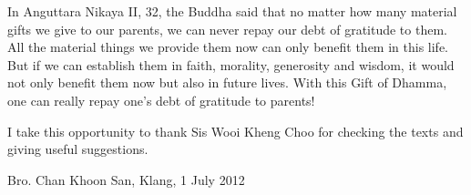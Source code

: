 In Anguttara Nikaya II, 32, the Buddha said that no matter how many material gifts we give to our parents, we can never repay our debt of gratitude to them. All the material things we provide them now can only benefit them in this life. But if we can establish them in faith, morality, generosity and wisdom, it would not only benefit them now but also in future lives. With this Gift of Dhamma, one can really repay one’s debt of gratitude to parents!

I take this opportunity to thank Sis Wooi Kheng Choo for checking the texts and giving useful suggestions.

Bro. Chan Khoon San, Klang, 1 July 2012

